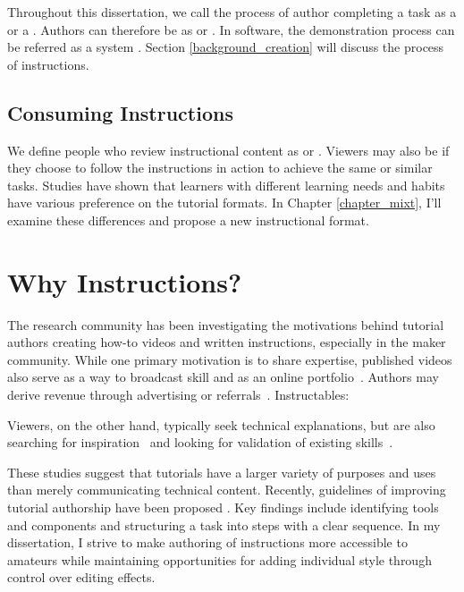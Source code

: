 Throughout this dissertation, we call the process of author completing a task as a  or a . Authors can therefore be as  or .
%
In software, the demonstration process can be referred as a system . Section \ref{background_creation} will discuss the  process of instructions.


\subsection{Consuming Instructions}
We define people who review instructional content as  or . Viewers may also be  if they choose to follow the instructions in action to achieve the same or similar tasks.
%
Studies have shown that learners with different learning needs and habits have various preference on the tutorial formats. In Chapter \ref{chapter_mixt}, I'll examine these differences and propose a new instructional format.



\section{Why Instructions?}
\label{background_why}

The research community has been investigating the motivations behind tutorial authors creating how-to videos and written instructions, especially in the maker community.
%
While one primary motivation is to share expertise, published videos also serve as a way to broadcast skill and as an online portfolio~\cite{Torrey:2007he,Kuznetsov:2010:REA:1868914.1868950}.
%
Authors may derive revenue through advertising or referrals~\cite{Lafreniere:2012tl}.
Instructables: \cite{Tseng:2014:PVP:2598510.2598540}

Viewers, on the other hand, typically seek technical explanations, but are also searching for inspiration~\cite{Torrey:2009fc} and looking for validation of existing skills~\cite{Lafreniere:2012tl}.

These studies suggest that tutorials have a larger variety of purposes and uses than merely communicating technical content. Recently, guidelines of improving tutorial authorship have been proposed \cite{Wakkary:2015:TAH:2702123.2702550}. Key findings include identifying tools and components and structuring a task into steps with a clear sequence.
%
In my dissertation, I strive to make authoring of instructions more accessible to amateurs while maintaining opportunities for adding individual style through control over editing effects.

